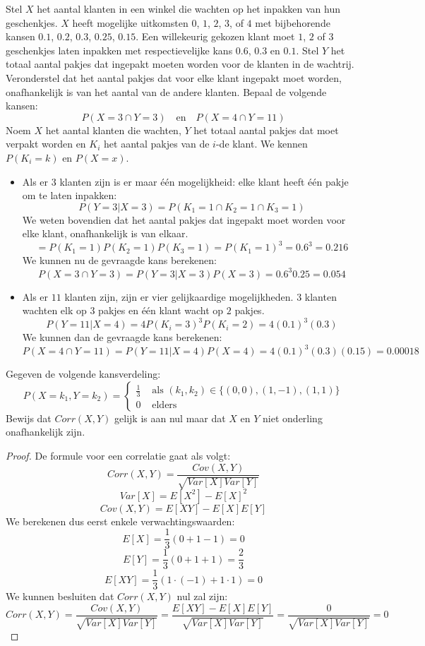 \documentclass[main.tex]{subfiles}
\begin{document}
\begin{oef}
  Stel $X$ het aantal klanten in een winkel die wachten op het inpakken van hun geschenkjes.
  $X$ heeft mogelijke uitkomsten $0$, $1$, $2$, $3$, of $4$ met bijbehorende kansen $0.1$, $0.2$, $0.3$, $0.25$, $0.15$.
   Een willekeurig gekozen klant moet $1$, $2$ of $3$ geschenkjes laten inpakken met respectievelijke kans $0.6$, $0.3$ en $0.1$.
   Stel $Y$ het totaal aantal pakjes dat ingepakt moeten worden voor de klanten in de wachtrij.
   Veronderstel dat het aantal pakjes dat voor elke klant ingepakt moet worden, onafhankelijk is van het aantal van de andere klanten.
   Bepaal de volgende kansen:
   \[ P(X=3 \cap Y=3) \quad \text{en} \quad P(X=4 \cap Y=11) \]
   Noem $X$ het aantal klanten die wachten, $Y$ het totaal aantal pakjes dat moet verpakt worden en $K_{i}$ het aantal pakjes van de $i$-de klant.
   We kennen $P(K_{i} = k)$ en $P(X = x)$.
   \begin{itemize}
   \item
     Als er $3$ klanten zijn is er maar \'e\'en mogelijkheid: elke klant heeft \'e\'en pakje om te laten inpakken:
     \[ P(Y=3|X=3) = P(K_{1}=1 \cap K_{2}=1 \cap K_{3}= 1) \]
     We weten bovendien dat het aantal pakjes dat ingepakt moet worden voor elke klant, onafhankelijk is van elkaar.
     \[ = P(K_{1}=1) P(K_{2}=1) P(K_{3}= 1) = P(K_{1} = 1)^{3} = 0.6^{3} = 0.216 \]
     We kunnen nu de gevraagde kans berekenen:
     \[ P(X=3 \cap Y=3) = P(Y=3|X=3)P(X=3) = 0.6^{3} 0.25 = 0.054 \]
   \item 
     Als er $11$ klanten zijn, zijn er vier gelijkaardige mogelijkheden.
     $3$ klanten wachten elk op $3$ pakjes en \'e\'en klant wacht op $2$ pakjes.
     \[ P(Y=11|X=4) = 4P(K_{i}=3)^{3}P(K_{i}=2) = 4(0.1)^{3}(0.3) \]
     We kunnen dan de gevraagde kans berekenen:
     \[ P(X=4 \cap Y=11) = P(Y=11|X=4)P(X=4) = 4(0.1)^{3}(0.3)(0.15) = 0.00018 \]
   \end{itemize}
\end{oef}

\begin{oef}
  Gegeven de volgende kansverdeling:
  \[
  P(X=k_{1},Y=k_{2}) = 
  \left\{
    \begin{array}{cl}
      \frac{1}{3} & \text{ als } (k_{1},k_{2}) \in \{(0,0),(1,-1),(1,1)\}\\
      0 & \text{ elders}
    \end{array}
  \right.
  \]
  Bewijs dat $Corr(X,Y)$ gelijk is aan nul maar dat $X$ en $Y$ niet onderling onafhankelijk zijn.
  \begin{proof}
    De formule voor een correlatie gaat als volgt:
    \[ Corr(X,Y) = \frac{Cov(X,Y)}{\sqrt{Var[X]Var[Y]}} \]
    \[ Var[X] = E[X^{2}] - E[X]^{2} \]
    \[ Cov(X,Y) = E[XY] - E[X]E[Y] \] We berekenen dus eerst enkele
    verwachtingswaarden:
    \[ E[X] = \frac{1}{3}\left(0+1-1\right) = 0 \]
    \[ E[Y] = \frac{1}{3}\left(0+1+1\right) = \frac{2}{3} \]
    \[ E[XY] = \frac{1}{3}\left(1\cdot (-1) + 1 \cdot 1\right) = 0 \]
    We kunnen besluiten dat $Corr(X,Y)$ nul zal zijn:
    \[ Corr(X,Y) = \frac{Cov(X,Y)}{\sqrt{Var[X]Var[Y]}} = \frac{E[XY] - E[X]E[Y]}{\sqrt{Var[X]Var[Y]}} = \frac{0}{\sqrt{Var[X]Var[Y]}} = 0 \]
  \end{proof}
\end{oef}
\end{document}
